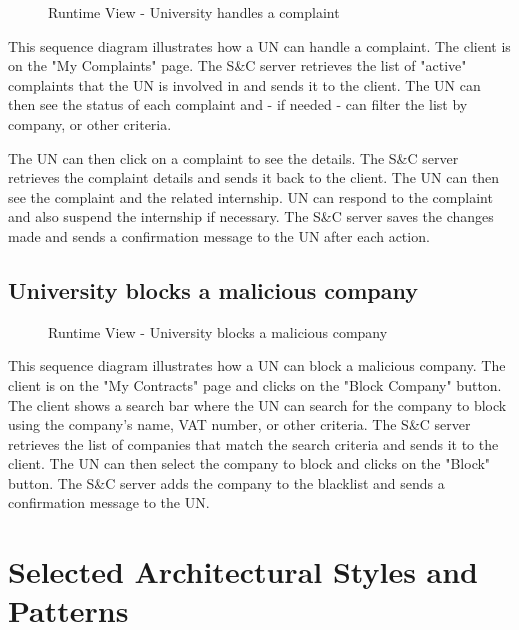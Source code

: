 \begin{figure}[H]
      \centering
      \caption{Runtime View - University handles a complaint}
      \label{fig:rv-un-handles-complaint}
\end{figure}

\par This sequence diagram illustrates how a UN can handle a complaint. The client is on the "My Complaints" page. The 
S\&C server retrieves the list of "active" complaints that the UN is involved in and sends it to the client. The UN can 
then see the status of each complaint and - if needed - can filter the list by company, or other criteria.

\par The UN can then click on a complaint to see the details. The S\&C server retrieves the complaint details and sends
it back to the client. The UN can then see the complaint and the related internship. UN can respond to the complaint 
and also suspend the internship if necessary. The S\&C server saves the changes made and sends a confirmation message 
to the UN after each action.

\subsection{University blocks a malicious company}
\label{sub:university-blocks-a-malicious-company}%

\begin{figure}[H]
      \centering
      \caption{Runtime View - University blocks a malicious company}
      \label{fig:rv-un-blocks-company}
\end{figure}

\par This sequence diagram illustrates how a UN can block a malicious company. The client is on the "My Contracts" page 
and clicks on the "Block Company" button. The client shows a search bar where the UN can search for the company to 
block using the company's name, VAT number, or other criteria. The S\&C server retrieves the list of companies that 
match the search criteria and sends it to the client. The UN can then select the company to block and clicks on the 
"Block" button. The S\&C server adds the company to the blacklist and sends a confirmation message to the UN.

\section{Selected Architectural Styles and Patterns}
\label{sec:selected-architectural-styles-patterns}%

